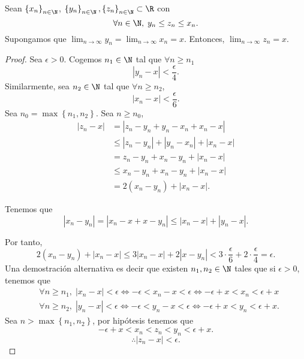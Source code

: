 \begin{ftheorem}
	\normalfont Sean $\displaystyle \left\{ x_{n}\right\}_{n\in\N} $, $\displaystyle \left\{ y_{n}\right\} _{n\in\N}, \left\{ z_{n}\right\} _{n\in\N}\subset\R $ con 
	\[\forall n \in \N, \; y_{n} \leq z_{n} \leq x_{n} .\]
Supongamos que $\displaystyle \lim_{n \to \infty}y_{n} = \lim_{n \to \infty}x_{n} = x $. Entonces, $\displaystyle \lim_{n \to \infty}z_{n} =x $.
\end{ftheorem}
\begin{proof}
	Sea $\displaystyle \epsilon > 0 $. Cogemos $\displaystyle n_{1} \in \N $ tal que $\displaystyle \forall n \geq n_{1} $ 
	\[ \left|y_{n}-x\right| < \frac{\epsilon }{4} .\]
Similarmente, sea $\displaystyle n_{2} \in \N $ tal que $\displaystyle \forall n\geq n_{2} $, 
\[ \left|x_{n} - x\right|< \frac{\epsilon }{6} .\]
Sea $\displaystyle n_{0} = \max \left\{ n_{1}, n_{2}\right\}  $. Sea $\displaystyle n \geq n_{0} $,
\[
\begin{split}
	\left|z_{n} - x\right| & = \left|z_{n}-y_{n}+y_{n}-x_{n}+x_{n}-x\right| \\
			       &\leq \left|z_{n}-y_{n}\right| + \left|y_{n}-x_{n}\right| + \left|x_{n}-x\right|\\
			       &= z_{n}-y_{n}+x_{n}-y_{n}+ \left|x_{n}-x\right| \\
			       & \leq x_{n}-y_{n} + x_{n}-y_{n} + \left|x_{n}-x\right| \\
			       & = 2\left(x_{n}-y_{n}\right) + \left|x_{n}-x\right| .
\end{split}
\]
\begin{observation}
\normalfont Tenemos que
\[ \left|x_{n}-y_{n}\right| = \left|x_{n}-x + x - y_{n}\right| \leq \left|x_{n}-x\right|+ \left|y_{n}-x\right| .\]
\end{observation}
Por tanto, 
\[2\left(x_{n}-y_{n}\right) + \left|x_{n}-x\right| \leq 3 \left|x_{n}-x\right| + 2 \left|x - y_{n}\right| < 3 \cdot \frac{\epsilon }{6} + 2 \cdot \frac{\epsilon }{4} = \epsilon .\]
Una demostración alternativa es decir que existen $\displaystyle n_{1}, n_{2} \in \N $ tales que si $\displaystyle \epsilon > 0 $, tenemos que 
\[
\begin{split}
& \forall n \geq n_{1}, \; \left|x_{n} - x\right| < \epsilon \iff -\epsilon < x_{n}-x < \epsilon  \iff -\epsilon + x < x_{n}< \epsilon + x\\
& \forall n \geq n_{2}, \; \left|y_{n}-x\right| < \epsilon \iff - \epsilon < y_{n}-x < \epsilon\iff -\epsilon + x < y_{n} < \epsilon + x.
\end{split}
\]
Sea $\displaystyle n > \max \left\{ n_{1}, n_{2}\right\}  $, por hipótesis tenemos que 
\[-\epsilon + x < x_{n} < z_{n} < y_{n} < \epsilon + x .\]
\[\therefore \left|z_{n}-x\right|<\epsilon  .\]
\end{proof}

